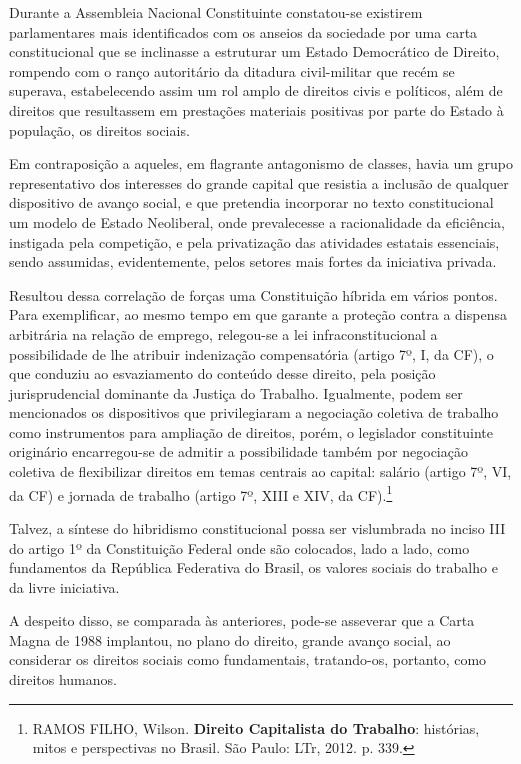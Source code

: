 Durante a Assembleia Nacional Constituinte constatou-se existirem
parlamentares mais identificados com os anseios da sociedade por uma
carta constitucional que se inclinasse a estruturar um Estado
Democrático de Direito, rompendo com o ranço autoritário da ditadura
civil-militar que recém se superava, estabelecendo assim um rol amplo de
direitos civis e políticos, além de direitos que resultassem em
prestações materiais positivas por parte do Estado à população, os
direitos sociais.

Em contraposição a aqueles, em flagrante antagonismo de classes, havia
um grupo representativo dos interesses do grande capital que resistia a
inclusão de qualquer dispositivo de avanço social, e que pretendia
incorporar no texto constitucional um modelo de Estado Neoliberal, onde
prevalecesse a racionalidade da eficiência, instigada pela competição, e
pela privatização das atividades estatais essenciais, sendo assumidas,
evidentemente, pelos setores mais fortes da iniciativa privada.

Resultou dessa correlação de forças uma Constituição híbrida em vários
pontos. Para exemplificar, ao mesmo tempo em que garante a proteção
contra a dispensa arbitrária na relação de emprego, relegou-se a lei
infraconstitucional a possibilidade de lhe atribuir indenização
compensatória (artigo 7º, I, da CF), o que conduziu ao esvaziamento do
conteúdo desse direito, pela posição jurisprudencial dominante da
Justiça do Trabalho. Igualmente, podem ser mencionados os dispositivos
que privilegiaram a negociação coletiva de trabalho como instrumentos
para ampliação de direitos, porém, o legislador constituinte originário
encarregou-se de admitir a possibilidade também por negociação coletiva
de flexibilizar direitos em temas centrais ao capital: salário (artigo
7º, VI, da CF) e jornada de trabalho (artigo 7º, XIII e XIV, da
CF).\footnote{RAMOS FILHO, Wilson. \textbf{Direito Capitalista do
  Trabalho}: histórias, mitos e perspectivas no Brasil. São Paulo: LTr,
  2012. p. 339.}

Talvez, a síntese do hibridismo constitucional possa ser vislumbrada no
inciso III do artigo 1º da Constituição Federal onde são colocados, lado
a lado, como fundamentos da República Federativa do Brasil, os valores
sociais do trabalho e da livre iniciativa.

A despeito disso, se comparada às anteriores, pode-se asseverar que a
Carta Magna de 1988 implantou, no plano do direito, grande avanço
social, ao considerar os direitos sociais como fundamentais,
tratando-os, portanto, como direitos humanos.

